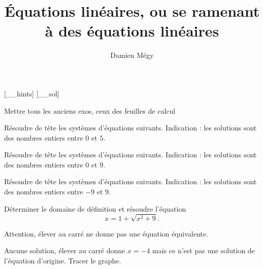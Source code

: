 




[_\jobname_hints]
[_\jobname_sol]


\title{Équations linéaires, ou se ramenant à des équations linéaires}
\author{Damien Mégy}
\maketitle


Mettre tous les anciens exos, ceux des feuilles de calcul

\begin{exo}
Résoudre de tête les systèmes d'équations suivants. Indication : les solutions sont des nombres entiers entre $0$ et $5$.
\end{exo}

\begin{exo}
Résoudre de tête les systèmes d'équations suivants. Indication : les solutions sont des nombres entiers entre $0$ et $9$.
\end{exo}

\begin{exo}
Résoudre de tête les systèmes d'équations suivants. Indication : les solutions sont des nombres entiers entre $-9$ et $9$.
\end{exo}

\begin{exo}
Déterminer le domaine de définition et résoudre l'équation 
\[ x=1+\sqrt{x^2+9}.\]
\begin{hint}
Attention, élever au carré ne donne pas une équation équivalente.
\end{hint}
\begin{sol}
Aucune solution, élever au carré donne $x=-4$ mais ce n'est pas une solution de l'équation d'origine. Tracer le graphe.
\end{sol}
\end{exo}



\begin{exo}
\begin{hint}
\end{hint}
\begin{sol}
\end{sol}
\end{exo}


\begin{exo}
\begin{hint}
\end{hint}
\begin{sol}
\end{sol}
\end{exo}


